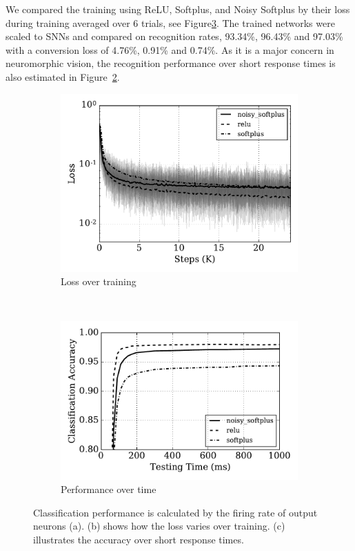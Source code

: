	
	We compared the training using ReLU, Softplus, and Noisy Softplus by their loss during training averaged over 6 trials, see Figure\ref{fig:training}.
	The trained networks were scaled to SNNs and compared on recognition rates, 93.34\%, 96.43\% and 97.03\% with a conversion loss of 4.76\%, 0.91\% and 0.74\%.
	As it is a major concern in neuromorphic vision, the recognition performance over short response times is also estimated in Figure~\ref{Fig:response}.
	\begin{figure}[bt!]
		\centering
		\begin{subfigure}[t]{0.7\textwidth}
			\includegraphics[width=\textwidth]{pics_iconip/8.pdf}
		    \caption{Loss over training}
		    \label{Fig:loss}
		\end{subfigure}\\
		\begin{subfigure}[t]{0.7\textwidth}
			\includegraphics[width=\textwidth]{pics_iconip/8-2.pdf}
		    \caption{Performance over time}
		    \label{Fig:response}
		\end{subfigure}

		\caption{
			Classification performance is calculated by the firing rate of output neurons (a).
			(b) shows how the loss varies over training.
			(c) illustrates the accuracy over short response times.}
		\label{fig:training}	
	\end{figure}
